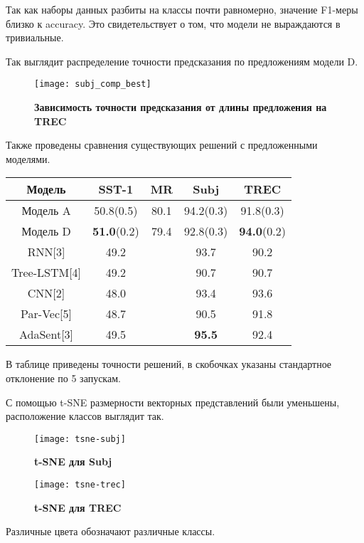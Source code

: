 Так как наборы данных разбиты на классы почти равномерно, значение F1-меры близко к accuracy.
Это свидетельствует о том, что модели не выраждаются в тривиальные.

Так выглядит распределение точности предсказания по предложениям модели D.

\begin{figure}[H]
\texttt{[image: subj\_comp\_best]}
\caption{\textbf{Зависимость точности предсказания от длины предложения на TREC}}
\label{fig:context_ex}
\end{figure}
\vspace{5mm}

Также проведены сравнения существующих решений с предложенными моделями.

\vspace{5mm}

\begin{tabular}{|c|c|c|c|c|}
\hline
Модель    & SST-1               & MR           & Subj         & TREC  \\ \hline
Модель A  & 50.8(0.5)           & 80.1         & 94.2(0.3)    & 91.8(0.3) \\
Модель D  & \textbf{51.0}(0.2)  & 79.4         & 92.8(0.3)    & \textbf{94.0}(0.2)\\ \hline
RNN[3]    & 49.2                &              & 93.7         & 90.2  \\
Tree-LSTM[4]& 49.2              &              & 90.7         & 90.7  \\
CNN[2]    & 48.0                &              & 93.4         & 93.6  \\
Par-Vec[5]& 48.7                &              & 90.5         & 91.8  \\
AdaSent[3]& 49.5                &              & \textbf{95.5}& 92.4 \\ \hline
\end{tabular}

\vspace{5mm}

В таблице приведены точности решений, в скобочках указаны стандартное отклонение по 5 запускам.

С помощью t-SNE размерности векторных представлений были уменьшены, расположение классов выглядит так.

\begin{figure}[H]
\texttt{[image: tsne-subj]}
\caption{\textbf{t-SNE для Subj}}
\label{fig:context_ex}
\end{figure}
\vspace{5mm}

\begin{figure}[H]
\texttt{[image: tsne-trec]}
\caption{\textbf{t-SNE для TREC}}
\label{fig:context_ex}
\end{figure}
\vspace{5mm}

Различные цвета обозначают различные классы.
